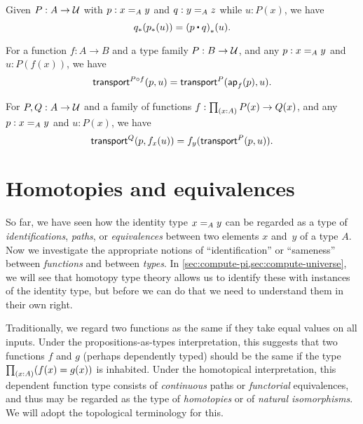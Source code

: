 \begin{lem}\label{thm:transport-concat}
  Given $P:A\to\type$ with $p:\id[A]xy$ and $q:\id[A]yz$ while $u:P(x)$, we have
  \[ \trans{q}{\trans{p}{u}} = \trans{(p\ct q)}{u}. \]
\end{lem}

\begin{lem}\label{thm:transport-compose}
  For a function $f:A\to B$ and a type family $P:B\to\type$, and any $p:\id[A]xy$ and $u:P(f(x))$, we have
  \[ \transfib{P\circ f}{p}{u} = \transfib{P}{\apfunc f(p)}{u}. \]
\end{lem}

\begin{lem}\label{thm:ap-transport}
  For $P,Q:A\to \type$ and a family of functions $f:\prd{x:A} P(x)\to Q(x)$, and any $p:\id[A]xy$ and $u:P(x)$, we have
  \[ \transfib{Q}{p}{f_x(u)} = f_y(\transfib{P}{p}{u}). \]
\end{lem}

%

\section{Homotopies and equivalences}
\label{sec:basics-equivalences}

%

So far, we have seen how the identity type $\id[A]xy$ can be regarded as a type of \emph{identifications}, \emph{paths}, or \emph{equivalences} between two elements $x$ and~$y$ of a type $A$.
Now we investigate the appropriate notions of ``identification'' or ``sameness'' between \emph{functions} and between \emph{types}.
In \cref{sec:compute-pi,sec:compute-universe}, we will see that homotopy type theory allows us to identify these with instances of the identity type, but before we can do that we need to understand them in their own right.

Traditionally, we regard two functions as the same if they take equal values on all inputs.
Under the propositions-as-types interpretation, this suggests that two functions $f$ and $g$ (perhaps dependently typed) should be the same if the type $\prd{x:A} (f(x)=g(x))$ is inhabited.
Under the homotopical interpretation, this dependent function type consists of \emph{continuous} paths or \emph{functorial} equivalences, and thus may be regarded as the type of \emph{homotopies} or of \emph{natural isomorphisms}.
We will adopt the topological terminology for this.

